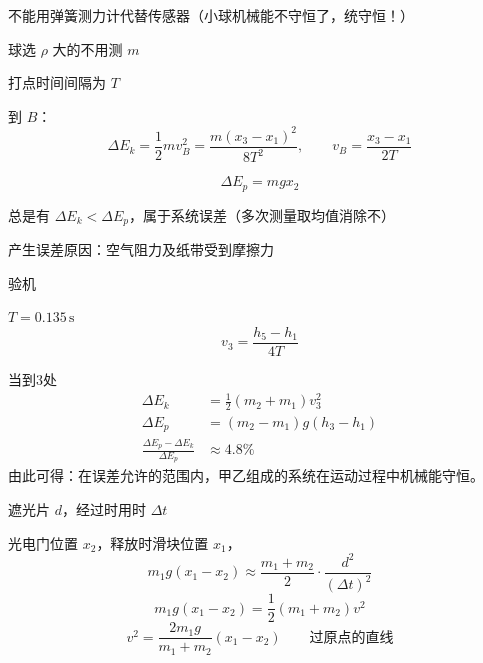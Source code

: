 不能用弹簧测力计代替传感器（小球机械能不守恒了，统守恒！）

球选 $\rho$ 大的\quad 不用测 $m$

打点时间间隔为 $T$

到 $B$：
\[ \Delta E_k=\frac12 mv_B^2=\frac{m(x_3-x_1)^2}{8T^2},\qquad v_B=\frac{x_3-x_1}{2T} \]


\[ \Delta E_p=mgx_2 \]

总是有 $\Delta E_k<\Delta E_p$，属于系统误差（多次测量取均值消除不）

产生误差原因：空气阻力及纸带受到摩擦力
\begin{problem}
验机 %



$T=0.135\,\mathrm{s}$ %
\[ v_3=\frac{h_5-h_1}{4T} \]

\begin{solution}
当到3处
\begin{align*}
\Delta E_k&=\frac12(m_2+m_1)v_3^2\\
\Delta E_p&=(m_2-m_1)g(h_3-h_1)\\
\frac{\Delta E_p-\Delta E_k}{\Delta E_p}&\approx 4.8\%
\end{align*}
由此可得：在误差允许的范围内，甲乙组成的系统在运动过程中机械能守恒。
\end{solution}
\end{problem}

遮光片 $d$，经过时用时 $\Delta t$ %

光电门位置 $x_2$，释放时滑块位置 $x_1$，
\[ m_1g(x_1-x_2)\approx\frac{m_1+m_2}{2}\cdot\frac{d^2}{(\Delta t)^2} \]
\[ m_1g(x_1-x_2)=\frac12(m_1+m_2)v^2 \]
\[ v^2=\frac{2m_1g}{m_1+m_2}(x_1-x_2)\qquad\text{过原点的直线} \]

